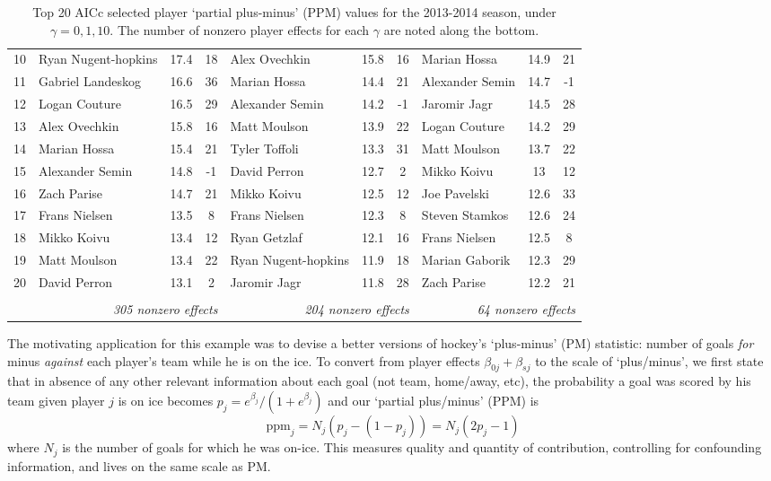 \documentclass[12pt]{article}
\newcommand{\mr}[1]{\mathrm{#1}}
\begin{document}
\begin{table}[tb]
{\begin{tabular}{l|lcc|lcc|lcc|}
10 & Ryan Nugent-hopkins & 17.4 & 18 & Alex Ovechkin & 15.8 & 16 & Marian Hossa & 14.9 & 21 \\
11 & Gabriel Landeskog & 16.6 & 36 & Marian Hossa & 14.4 & 21 & Alexander Semin & 14.7 & -1 \\
12 & Logan Couture & 16.5 & 29 & Alexander Semin & 14.2 & -1 & Jaromir Jagr & 14.5 & 28 \\
13 & Alex Ovechkin & 15.8 & 16 & Matt Moulson & 13.9 & 22 & Logan Couture & 14.2 & 29 \\
14 & Marian Hossa & 15.4 & 21 & Tyler Toffoli & 13.3 & 31 & Matt Moulson & 13.7 & 22 \\
15 & Alexander Semin & 14.8 & -1 & David Perron & 12.7 & 2 & Mikko Koivu & 13 & 12 \\
16 & Zach Parise & 14.7 & 21 & Mikko Koivu & 12.5 & 12 & Joe Pavelski & 12.6 & 33 \\
17 & Frans Nielsen & 13.5 & 8 & Frans Nielsen & 12.3 & 8 & Steven Stamkos & 12.6 & 24 \\
18 & Mikko Koivu & 13.4 & 12 & Ryan Getzlaf & 12.1 & 16 & Frans Nielsen & 12.5 & 8 \\
19 & Matt Moulson & 13.4 & 22 & Ryan Nugent-hopkins & 11.9 & 18 & Marian Gaborik & 12.3 & 29 \\
20 & David Perron & 13.1 & 2 & Jaromir Jagr & 11.8 & 28 & Zach Parise & 12.2 & 21 \\
\multicolumn{1}{c}{} & \multicolumn{3}{r|}{} & \multicolumn{3}{r|}{} &  \multicolumn{3}{r|}{}\\
 \multicolumn{1}{c}{} & \multicolumn{3}{r|}{\it 305 nonzero effects} & \multicolumn{3}{r|}{\it 204 nonzero effects} &  \multicolumn{3}{r|}{\it 64 nonzero effects}
\end{tabular}}
\caption{\label{nhleffects} Top 20 AICc selected player `partial plus-minus' (PPM) values for the 2013-2014 season, under $\gamma = 0,1,10$.  The number of nonzero player effects for each $\gamma$ are noted along the bottom.}
\end{table}

The motivating application for this example was to devise a better versions of
hockey's `plus-minus' (PM) statistic: number of goals {\it for} minus {\it
against} each player's team while he is on the ice. To convert from player
effects $\beta_{0j} + \beta_{sj}$ to the scale of `plus/minus', we first state
that in absence of any other relevant information about each goal (not team,
home/away, etc), the probability a goal was scored by his team given player
$j$ is on ice becomes $p_j = e^{\beta_j}/(1+e^{\beta_j})$ and our `partial
plus/minus' (PPM) is \[ \mr{ppm}_j = N_j(p_j - (1-p_j)) = N_j(2p_j-1) \] where
$N_j$ is the  number of goals for which he was on-ice.  This measures 
quality and quantity of contribution, controlling for
confounding information, and lives on the same scale as PM.
\end{document}
